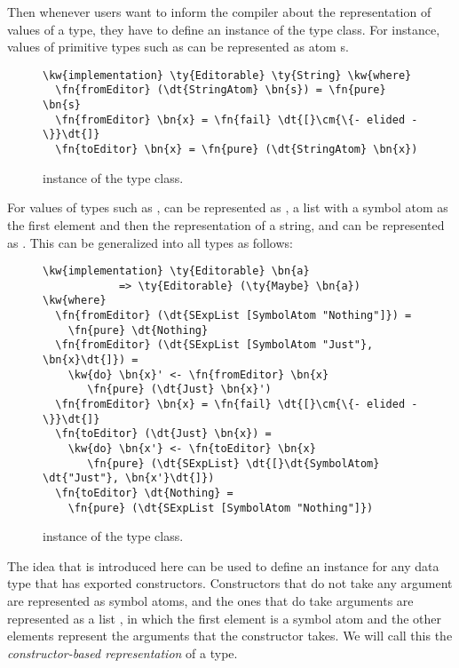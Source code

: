Then whenever users want to inform the compiler about the \sexp{}
representation of values of a type, they have to define an instance of the
\Editorable{} type class.
For instance, values of primitive types such as  can be represented
as atom \sexp{}s.

\begin{figure}[H]
\begin{Verbatim}
\kw{implementation} \ty{Editorable} \ty{String} \kw{where}
  \fn{fromEditor} (\dt{StringAtom} \bn{s}) = \fn{pure} \bn{s}
  \fn{fromEditor} \bn{x} = \fn{fail} \dt{[}\cm{\{- elided -\}}\dt{]}
  \fn{toEditor} \bn{x} = \fn{pure} (\dt{StringAtom} \bn{x})
\end{Verbatim}
\caption{ instance of the  type class.}
\label{code:editorableString}
\end{figure}

For values of types such as \mbox{},
 can be represented as , a list
\sexp{} with a symbol atom as the first element and then the \sexp{}
representation of a string, and  can be represented as
. This can be generalized into all  types as follows:

\begin{figure}[H]
\begin{Verbatim}
\kw{implementation} \ty{Editorable} \bn{a}
            => \ty{Editorable} (\ty{Maybe} \bn{a}) \kw{where}
  \fn{fromEditor} (\dt{SExpList [SymbolAtom "Nothing"]}) =
    \fn{pure} \dt{Nothing}
  \fn{fromEditor} (\dt{SExpList [SymbolAtom "Just"}, \bn{x}\dt{]}) =
    \kw{do} \bn{x}' <- \fn{fromEditor} \bn{x}
       \fn{pure} (\dt{Just} \bn{x}')
  \fn{fromEditor} \bn{x} = \fn{fail} \dt{[}\cm{\{- elided -\}}\dt{]}
  \fn{toEditor} (\dt{Just} \bn{x}) =
    \kw{do} \bn{x'} <- \fn{toEditor} \bn{x}
       \fn{pure} (\dt{SExpList} \dt{[}\dt{SymbolAtom} \dt{"Just"}, \bn{x'}\dt{]})
  \fn{toEditor} \dt{Nothing} =
    \fn{pure} (\dt{SExpList [SymbolAtom "Nothing"]})
\end{Verbatim}
\label{code:editorableMaybe}
\caption{ instance of the  type class.}
\end{figure}

The idea that is introduced here can be used to define an \Editorable{}
instance for any data type that has exported constructors. Constructors that do
not take any argument are represented as symbol atoms, and the ones that do
take arguments are represented as a list \sexp{}, in which the first element is
a symbol atom and the other elements represent the arguments that the
constructor takes. We will call this the \emph{constructor-based \sexp{}
representation} of a type.

